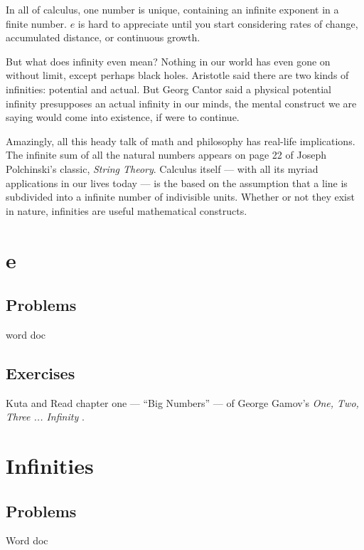


In all of calculus, one number is unique, containing an infinite exponent in a finite number.
$e$ is hard to appreciate until you start considering rates of change, 
accumulated distance, or continuous growth.  

But what does infinity even mean?  Nothing in our world has even gone on without limit,
except perhaps black holes.  Aristotle said there are two kinds of infinities: potential and
actual.  But Georg Cantor said a physical potential infinity presupposes an actual infinity
in our minds, the mental construct we are saying would come into existence, if were to 
continue.

Amazingly, all this heady talk of math and philosophy has real-life implications.  The infinite
sum of all the natural numbers appears on page 22 of Joseph Polchinski's classic, 
\textit{String Theory}.  Calculus itself --- with all its myriad applications in our lives today
--- is the based on the assumption that a line is subdivided into a infinite number of
indivisible units.  Whether or not they exist in nature, infinities are useful mathematical
constructs.





\newpage
\chapterminitoc

\newpage
\section{e}
\subsection{Problems}
word doc
\newpage

\newpage
\subsection{Exercises}
Kuta and
Read chapter one --- ``Big Numbers'' --- of George Gamov's
\textit{One, Two, Three ... Infinity} .



\newpage
\section{Infinities}
\subsection{Problems}
Word doc
\newpage

\newpage
